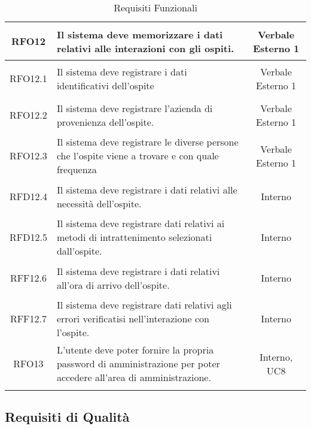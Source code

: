 \begin{longtable}{|c|>{\centering}m{7cm}|c|}
\hypertarget{RFO12}{RFO12} & Il sistema deve memorizzare i dati relativi alle interazioni con gli ospiti. & Verbale Esterno 1\\ \hline
\hypertarget{RFO12.1}{RFO12.1} & Il sistema deve registrare i dati identificativi dell'ospite & Verbale Esterno 1\\ \hline
\hypertarget{RFO12.2}{RFO12.2} & Il sistema deve registrare l'azienda di provenienza dell'ospite. & Verbale Esterno 1\\ \hline
\hypertarget{RFO12.3}{RFO12.3} & Il sistema deve registrare le diverse persone che l'ospite viene a trovare e con quale frequenza & Verbale Esterno 1\\ \hline
\hypertarget{RFD12.4}{RFD12.4} & Il sistema deve registrare i dati relativi alle necessità  dell'ospite. & Interno\\ \hline
\hypertarget{RFD12.5}{RFD12.5} & Il sistema deve registrare dati relativi ai metodi di intrattenimento selezionati dall'ospite. & Interno\\ \hline
\hypertarget{RFF12.6}{RFF12.6} & Il sistema deve registrare i dati relativi all'ora di arrivo dell'ospite. & Interno\\ \hline
\hypertarget{RFF12.7}{RFF12.7} & Il sistema deve registrare dati relativi agli errori verificatisi nell'interazione con l'ospite. & Interno\\ \hline
\hypertarget{RFO13}{RFO13} & L'utente deve poter fornire la propria password di amministrazione per poter accedere all'area di amministrazione. & Interno, UC8\\ \hline

\caption[Requisiti Funzionali]{Requisiti Funzionali}
\label{tabella:req0}
\end{longtable}
\clearpage
\newpage\subsection{Requisiti di Qualità}
\normalsize
